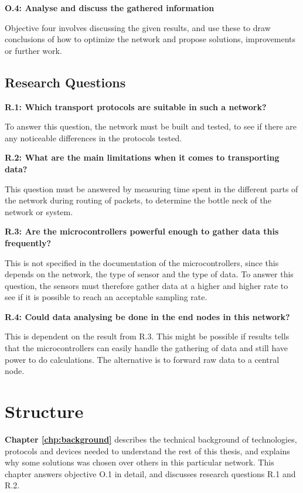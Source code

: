 \noindent\textbf{O.4: Analyse and discuss the gathered information}

\noindent Objective four involves discussing the given results, and use these to draw conclusions of how to optimize the network and propose solutions, improvements or further work. 

\subsection{Research Questions}

\noindent \textbf{R.1: Which transport protocols are suitable in such a network?}

\noindent To answer this question, the network must be built and tested, to see if there are any noticeable differences in the protocols tested.

\noindent\textbf{R.2: What are the main limitations when it comes to transporting data?}

\noindent This question must be answered by measuring time spent in the different parts of the network during routing of packets, to determine the bottle neck of the network or system. 

\noindent\textbf{R.3: Are the microcontrollers powerful enough to gather data this frequently?}

\noindent This is not specified in the documentation of the microcontrollers, since this depends on the network, the type of sensor and the type of data. To answer this question, the sensors must therefore gather data at a higher and higher rate to see if it is possible to reach an acceptable sampling rate. 

\noindent\textbf{R.4: Could data analysing be done in the end nodes in this network?}

\noindent This is dependent on the result from R.3. This might be possible if results tells that the microcontrollers can easily handle the gathering of data and still have power to do calculations. The alternative is to forward raw data to a central node. 

\section{Structure}


\noindent \textbf{Chapter \ref{chp:background}} describes the technical background of technologies, protocols and devices needed to understand the rest of this thesis, and explains why some solutions was chosen over others in this particular network. This chapter answers objective O.1 in detail, and discusses research questions R.1 and R.2. 


